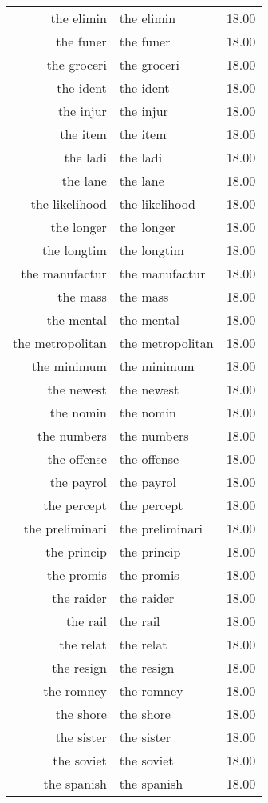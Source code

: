 \begin{table}[ht]
\begin{tabular}{rlr}
  the elimin & the elimin & 18.00 \\ 
  the funer & the funer & 18.00 \\ 
  the groceri & the groceri & 18.00 \\ 
  the ident & the ident & 18.00 \\ 
  the injur & the injur & 18.00 \\ 
  the item & the item & 18.00 \\ 
  the ladi & the ladi & 18.00 \\ 
  the lane & the lane & 18.00 \\ 
  the likelihood & the likelihood & 18.00 \\ 
  the longer & the longer & 18.00 \\ 
  the longtim & the longtim & 18.00 \\ 
  the manufactur & the manufactur & 18.00 \\ 
  the mass & the mass & 18.00 \\ 
  the mental & the mental & 18.00 \\ 
  the metropolitan & the metropolitan & 18.00 \\ 
  the minimum & the minimum & 18.00 \\ 
  the newest & the newest & 18.00 \\ 
  the nomin & the nomin & 18.00 \\ 
  the numbers & the numbers & 18.00 \\ 
  the offense & the offense & 18.00 \\ 
  the payrol & the payrol & 18.00 \\ 
  the percept & the percept & 18.00 \\ 
  the preliminari & the preliminari & 18.00 \\ 
  the princip & the princip & 18.00 \\ 
  the promis & the promis & 18.00 \\ 
  the raider & the raider & 18.00 \\ 
  the rail & the rail & 18.00 \\ 
  the relat & the relat & 18.00 \\ 
  the resign & the resign & 18.00 \\ 
  the romney & the romney & 18.00 \\ 
  the shore & the shore & 18.00 \\ 
  the sister & the sister & 18.00 \\ 
  the soviet & the soviet & 18.00 \\ 
  the spanish & the spanish & 18.00 \\ 

\end{tabular}
\end{table}
